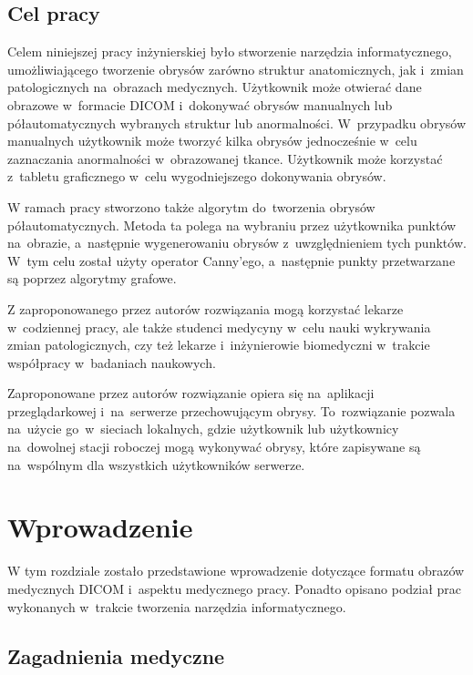 \documentclass[a4paper,11pt,twoside,openright]{report}
\theoremstyle{definition}
\begin{document}
\section*{Cel pracy}

Celem niniejszej pracy inżynierskiej było stworzenie narzędzia informatycznego,
umożliwiającego tworzenie obrysów zarówno struktur anatomicznych, jak i~zmian patologicznych
na~obrazach medycznych. Użytkownik może otwierać
dane obrazowe w~formacie DICOM i~dokonywać obrysów manualnych lub półautomatycznych
wybranych struktur lub anormalności. W~przypadku obrysów manualnych użytkownik
może tworzyć kilka obrysów jednocześnie w~celu zaznaczania anormalności w~obrazowanej tkance.
Użytkownik może korzystać z~tabletu graficznego w~celu wygodniejszego dokonywania obrysów.

W ramach pracy stworzono także algorytm do~tworzenia obrysów półautomatycznych.
Metoda ta polega na wybraniu przez użytkownika punktów na~obrazie, a~następnie
wygenerowaniu obrysów z~uwzględnieniem tych punktów. W~tym celu
został użyty operator Canny'ego, a~następnie punkty przetwarzane są
poprzez algorytmy grafowe.

Z zaproponowanego przez autorów rozwiązania mogą korzystać lekarze w~codziennej pracy, ale także
studenci medycyny w~celu nauki wykrywania zmian patologicznych, czy też lekarze i~inżynierowie
biomedyczni w~trakcie współpracy w~badaniach naukowych.

Zaproponowane przez autorów rozwiązanie opiera się na~aplikacji przeglądarkowej
i~na~serwerze przechowującym obrysy. To~rozwiązanie pozwala na~użycie go~w~sieciach
lokalnych, gdzie użytkownik lub użytkownicy na~dowolnej stacji roboczej mogą
wykonywać obrysy, które zapisywane są na~wspólnym dla wszystkich użytkowników serwerze.


\chapter {Wprowadzenie}

W tym rozdziale zostało przedstawione wprowadzenie dotyczące formatu obrazów
medycznych DICOM i~aspektu medycznego pracy.
Ponadto opisano podział prac wykonanych w~trakcie tworzenia
narzędzia informatycznego.

\section {Zagadnienia medyczne}
\end{document}

